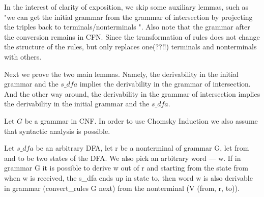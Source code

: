 In the interest of clarity of exposition, we skip some auxiliary lemmas, such as "we can get the initial grammar from the grammar of intersection by projecting the triples back to terminals/nonterminals ". Also note that the grammar after the conversion remains in CFN. Since the transformation of rules does not change the structure of the rules, but only replaces one(??!!) terminals and nonterminals with others.









Next we prove the two main lemmas. Namely, the derivability in the initial grammar and the $s\_dfa$ implies the derivability in the grammar of intersection. And the other way around, the derivability in the grammar of intersection implies the derivability in the initial grammar and the $s\_dfa$.

Let $G$ be a grammar in CNF. In order to use Chomsky Induction we also assume that syntactic analysis is possible. 

\begin{theorem}
    Let $s\_dfa$ be an arbitrary DFA, let r be a nonterminal of grammar G, let from and to be two states of the DFA. We also pick an arbitrary word --- w. If in grammar G it is possible to derive w out of r and starting from the state from when w is received, the s\_dfa ends up in state to, then word w is also derivable in grammar (convert\_rules G next) from the nonterminal (V (from, r, to)).
\end{theorem}

